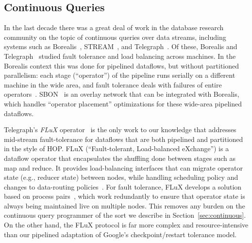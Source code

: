 \subsection{Continuous Queries}
In the last decade there was a great deal of work in the database research
community on the topic of continuous queries over data streams, including
systems such as Borealis~\cite{borealis}, STREAM~\cite{stream}, and
Telegraph~\cite{tcq-cidr}.  Of these, Borealis and Telegraph~\cite{flux-ft}
studied fault tolerance and load balancing across machines.  In the Borealis
context this was done for pipelined dataflows, but without partitioned
parallelism: each stage (``operator'') of the pipeline runs serially on a
different machine in the wide area, and fault tolerance deals with failures of
entire operators~\cite{borealisFT}.  SBON~\cite{sbon} is an overlay network that
can be integrated with Borealis, which handles ``operator placement''
optimizations for these wide-area pipelined dataflows.

Telegraph's \emph{FLuX} operator~\cite{flux-ft,flux-lb} is the only work to our
knowledge that addresses mid-stream fault-tolerance for dataflows that are both
pipelined and partitioned in the style of HOP\@. FLuX (``Fault-tolerant,
Load-balanced eXchange'') is a dataflow operator that encapsulates the shuffling
done between stages such as map and reduce.  It provides load-balancing
interfaces that can migrate operator state (e.g., reducer state) between nodes,
while handling scheduling policy and changes to data-routing
policies~\cite{flux-lb}.  For fault tolerance, FLuX develops a solution based on
process pairs~\cite{flux-ft}, which work redundantly to ensure that operator
state is always being maintained live on multiple nodes.  This removes any
burden on the continuous query programmer of the sort we describe in
Section~\ref{sec:continuous}.  On the other hand, the FLuX protocol is far more
complex and resource-intensive than our pipelined adaptation of Google's
checkpoint/restart tolerance model.



